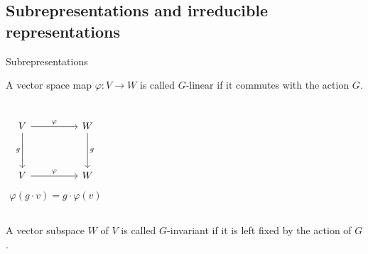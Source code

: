 \documentclass[handout, 10pt]{beamer}
\begin{document}
	\subsection{Subrepresentations and irreducible representations}
	
	\begin{frame}{Subrepresentations}
		\begin{definition}
			A vector space map $\varphi : V \rightarrow W$ is called $G$-linear if it commutes with the action $G$.
			\begin{columns}
				\[\begin{tikzcd}[ampersand replacement=\&]
					V \&\& W \\
					\\
					V \&\& W
					\arrow["\varphi", from=1-1, to=1-3]
					\arrow["g"', from=1-1, to=3-1]
					\arrow["g", from=1-3, to=3-3]
					\arrow["\varphi", from=3-1, to=3-3]
				\end{tikzcd}\]
				\begin{align*}
					\varphi(g \cdot v) = g \cdot \varphi(v)
				\end{align*}
			\end{columns}
		\end{definition}
			
		\begin{definition}
			A vector subspace $W$ of $V$ is called $G$-invariant if it is left fixed by the action of $G$.
		\end{definition}
	\end{frame}	
	
\end{document}
